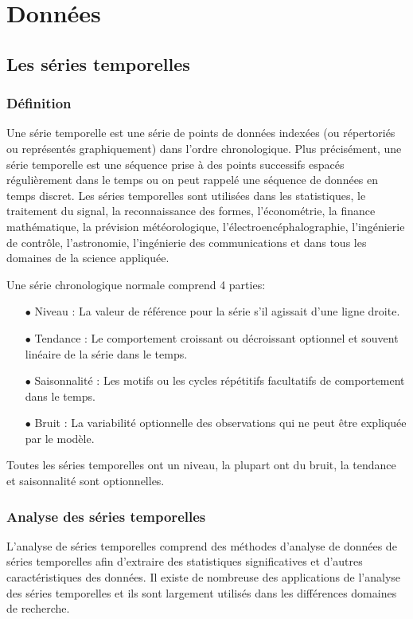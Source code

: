 \chapter{Donn\'ees}
\label{chap2}
\section{Les séries temporelles}
\subsection {Définition}
Une série temporelle est une série de points de données indexées (ou répertoriés ou représentés graphiquement) dans l'ordre chronologique. Plus précisément,  une série temporelle est une séquence prise à des points successifs espacés régulièrement dans le temps ou on peut rappelé une séquence de données en temps discret. Les séries temporelles sont utilisées dans les statistiques, le traitement du signal, la reconnaissance des formes, l'économétrie, la finance mathématique, la prévision météorologique, l'électroencéphalographie, l'ingénierie de contrôle, l'astronomie, l'ingénierie des communications et dans tous les domaines de la science appliquée. 

Une série chronologique normale comprend 4 parties:
\begin{itemize} 
\item[$\bullet$] Niveau : La valeur de référence pour la série s'il agissait d'une ligne droite.
\item[$\bullet$] Tendance : Le comportement croissant ou décroissant optionnel et souvent linéaire de la série dans le temps.
\item[$\bullet$] Saisonnalité : Les motifs ou les cycles répétitifs facultatifs de comportement dans le temps.
\item[$\bullet$] Bruit : La variabilité optionnelle des observations qui ne peut être expliquée par le modèle.
\end{itemize} 
Toutes les séries temporelles ont un niveau, la plupart ont du bruit, la tendance et saisonnalité sont optionnelles. 

\subsection{Analyse des séries temporelles}
L'analyse de séries temporelles comprend des méthodes d'analyse de données de séries temporelles afin d'extraire des statistiques significatives et d'autres caractéristiques des données. Il existe de nombreuse des applications de l'analyse des séries temporelles et ils sont largement utilisés dans les différences domaines de recherche.

